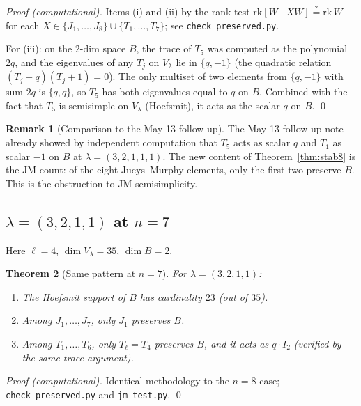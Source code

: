 \documentclass[11pt]{article}
\newtheorem{theorem}{Theorem}
\theoremstyle{definition}
\newtheorem{remark}[theorem]{Remark}
\begin{document}
\begin{proof}[Proof (computational)]
Items (i) and (ii) by the rank test
$\mathrm{rk}[W \mid X W] \stackrel{?}{=} \mathrm{rk}\,W$ for each
$X \in \{J_1, \ldots, J_8\} \cup \{T_1, \ldots, T_7\}$;
see \texttt{check\_preserved.py}.

For (iii): on the $2$-dim space $B$, the trace of $T_5$ was computed as
the polynomial $2q$, and the eigenvalues of any $T_j$ on $V_\lambda$ lie
in $\{q, -1\}$ (the quadratic relation $(T_j - q)(T_j + 1) = 0$). The
only multiset of two elements from $\{q, -1\}$ with sum $2q$ is
$\{q, q\}$, so $T_5$ has both eigenvalues equal to $q$ on $B$. Combined
with the fact that $T_5$ is semisimple on $V_\lambda$ (Hoefsmit), it
acts as the scalar $q$ on $B$. \qed
\end{proof}

\begin{remark}[Comparison to the May-13 follow-up]
The May-13 follow-up note already showed by independent computation
that $T_5$ acts as scalar $q$ and $T_1$ as scalar $-1$ on $B$ at
$\lambda = (3,2,1,1,1)$. The new content of Theorem~\ref{thm:stab8} is
the JM count: of the eight Jucys--Murphy elements, only the first two
preserve $B$. This is the obstruction to JM-semisimplicity.
\end{remark}

\subsection{$\lambda = (3,2,1,1)$ at $n = 7$}\label{ssec:n7}

Here $\ell = 4$, $\dim V_\lambda = 35$, $\dim B = 2$.

\begin{theorem}[Same pattern at $n = 7$]\label{thm:n7}
For $\lambda = (3,2,1,1)$:
\begin{enumerate}[label=(\roman*),topsep=0.2em,itemsep=0.1em]
\item The Hoefsmit support of $B$ has cardinality $23$ (out of $35$).
\item Among $J_1, \ldots, J_7$, only $J_1$ preserves $B$.
\item Among $T_1, \ldots, T_6$, only $T_\ell = T_4$ preserves $B$, and
   it acts as $q \cdot I_2$ (verified by the same trace argument).
\end{enumerate}
\end{theorem}

\begin{proof}[Proof (computational)]
Identical methodology to the $n = 8$ case;
\texttt{check\_preserved.py} and \texttt{jm\_test.py}. \qed
\end{proof}
\end{document}
